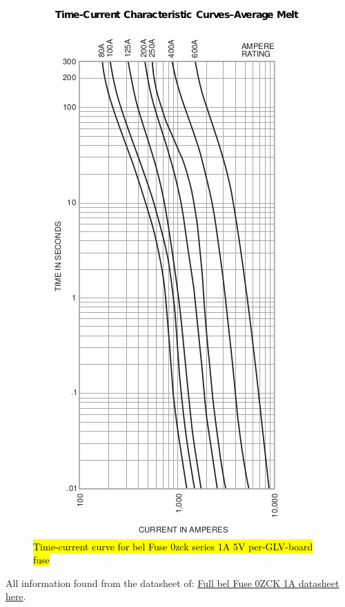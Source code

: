 \documentclass{article}
\DeclareRobustCommand{\hlr}[1]{{\sethlcolor{red}\hl{#1}}}
\begin{document}
\begin{figure}[H]
    \centering
    \includegraphics[width = 0.7 \textwidth]{TSfuseT-Agraph}
    \caption{\hlr{Time-current curve for bel Fuse 0zck series 1A 5V per-GLV-board fuse}}
    \label{5V1Afusecurve}
\end{figure}

All information found from the datasheet of:
\href{http://www.belfuse.com/pdfs/0ZCK.pdf}{Full bel Fuse 0ZCK 1A datasheet here}.

\end{document}
